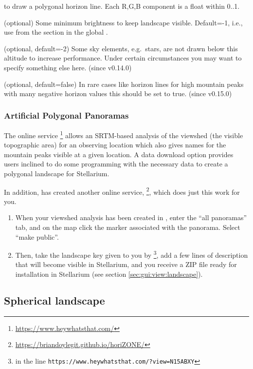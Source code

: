 \begin{description}
  to draw a polygonal horizon line. Each R,G,B component is a float
  within 0..1.
\item[\var{minimal\_brightness}] (optional) Some minimum brightness to
  keep landscape visible. Default=-1, i.e., use
   from the \var{[landscape]} section in the
  global .
\item[\var{minimal\_altitude}] (optional, default=-2) Some sky
  elements, e.g.\ stars, are not drawn below this altitude to increase
  performance. Under certain circumstances you may want to specify
  something else here. (since v0.14.0)
\item[\var{polygonal\_horizon\_inverted}] (optional, default=false) In
  rare cases like horizon lines for high mountain peaks with many
  negative horizon values this should be set to true. (since v0.15.0)
\end{description}

\subsubsection{Artificial Polygonal Panoramas}
The online service
\footnote{\url{https://www.heywhatsthat.com/}}
allows an SRTM-based analysis of the viewshed (the visible topographic
area) for an observing location which also gives names for the
mountain peaks visible at a given location.  A data download option
provides users inclined to do some programming with the necessary data
to create a polygonal landscape for Stellarium.

In addition,  has created another online service,
\footnote{\url{https://briandoylegit.github.io/horiZONE/}},
which does just this work for you.
\begin{enumerate}
\item When your viewshed analysis has been created in
  , enter the ``all panoramas'' tab, and on the
  map click the marker associated with the panorama. Select ``make
  public''.
\item Then, take the landscape key given to you by \footnote{
in the line \texttt{https://www.heywhatsthat.com/?view=N15ABXY}}, add
a few lines of description that will become visible in Stellarium, and you
receive a ZIP file ready for installation in Stellarium (see section
\ref{sec:gui:view:landscape}).
\end{enumerate}


\subsection{Spherical landscape}
\label{sec:landscapes:Spherical}

